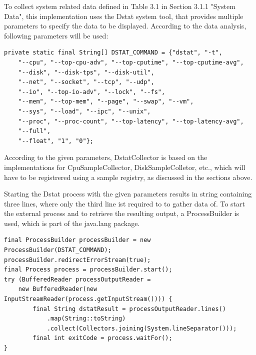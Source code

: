 To collect system related data defined in Table 3.1 in Section 3.1.1 "System Data", this implementation uses the Dstat system tool,
that provides multiple parameters to specify the data to be displayed. According to the data analysis, following parameters will be used:

\begin{lstlisting}[caption={"DstatCollector" program parameters in }, captionpos=b, label={lst:dstat-parameters}]
private static final String[] DSTAT_COMMAND = {"dstat", "-t",
    "--cpu", "--top-cpu-adv", "--top-cputime", "--top-cputime-avg",
    "--disk", "--disk-tps", "--disk-util",
    "--net", "--socket", "--tcp", "--udp",
    "--io", "--top-io-adv", "--lock", "--fs",
    "--mem", "--top-mem", "--page", "--swap", "--vm",
    "--sys", "--load", "--ipc", "--unix",
    "--proc", "--proc-count", "--top-latency", "--top-latency-avg",
    "--full",
    "--float", "1", "0"};
\end{lstlisting}

According to the given parameters, DstatCollector is based on the implementations for CpuSampleCollector, DiskSampleColletor, etc.,
which will have to be registrered using a sample registry, as discussed in the sections above.

Starting the Dstat process with the given parameters results in string containing three lines, where only the third line ist required to
to gather data of. To start the external process and to retrieve the resulting output, a ProcessBuilder is used, which is part of
the java.lang package.
\begin{lstlisting}[caption={ProcessBuilder in "DstatCollector"}, captionpos=b, label={lst:dstatprocessbuilder}]
final ProcessBuilder processBuilder = new ProcessBuilder(DSTAT_COMMAND);
processBuilder.redirectErrorStream(true);
final Process process = processBuilder.start();
try (BufferedReader processOutputReader =
    new BufferedReader(new InputStreamReader(process.getInputStream()))) {
        final String dstatResult = processOutputReader.lines()
            .map(String::toString)
            .collect(Collectors.joining(System.lineSeparator()));
        final int exitCode = process.waitFor();
}
\end{lstlisting}

